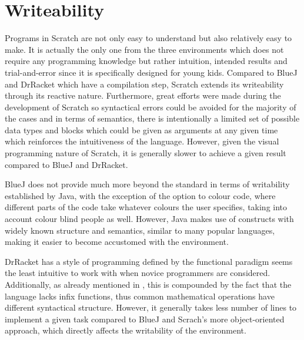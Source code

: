 \section{Writeability}
\label{sec:writability}

 Programs in Scratch are not only easy to understand but also relatively easy to make. It is actually the only one from the three environments which does not require any programming knowledge but rather intuition, intended results and trial-and-error since it is specifically designed for young kids. Compared to BlueJ and DrRacket which have a compilation step, Scratch extends its writeability through its reactive nature. Furthermore, great efforts were made during the development of Scratch so syntactical errors could be avoided for the majority of the cases and in terms of semantics, there is intentionally a limited set of possible data types and blocks which could be given as arguments at any given time which reinforces the intuitiveness of the language. However, given the visual programming nature of Scratch, it is generally slower to achieve a given result compared to BlueJ and DrRacket. 	 

BlueJ does not provide much more beyond the standard in terms of writability established by Java, with the exception of the option to colour code, where different parts of the code take whatever colours the user specifies, taking into account colour blind people as well. However, Java makes use of constructs with widely known structure and semantics, similar to many popular languages, making it easier to become accustomed with the environment.

DrRacket has a style of programming defined by the functional paradigm seems the least intuitive to work with when novice programmers are considered. Additionally, as already mentioned in , this is compounded by the fact that the language lacks infix functions, thus common mathematical operations have different syntactical structure. However, it generally takes less number of lines to implement a given task compared to BlueJ and Scrach's more object-oriented approach, which directly affects the writability of the environment.